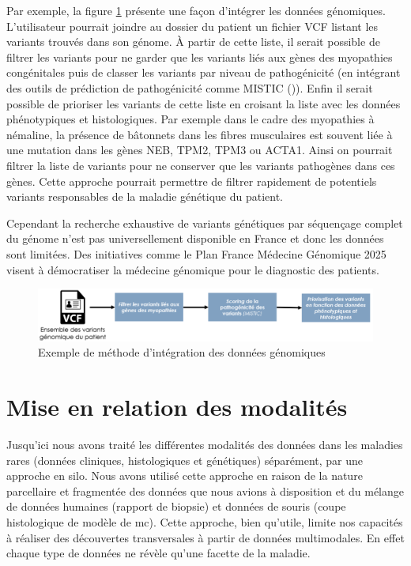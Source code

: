 Par exemple, la figure \ref{fig:variant_discuss} présente une façon d'intégrer les données génomiques. L'utilisateur pourrait joindre au dossier du patient un fichier VCF listant les variants trouvés dans son génome. À partir de cette liste, il serait possible de filtrer les variants pour ne garder que les variants liés aux gènes des myopathies congénitales puis de classer les variants par niveau de pathogénicité (en intégrant des outils de prédiction de pathogénicité comme MISTIC (\cite{chennen_mistic_2020})). Enfin il serait possible de prioriser les variants de cette liste en croisant la liste avec les données phénotypiques et histologiques. Par exemple dans le cadre des myopathies à némaline, la présence de bâtonnets dans les fibres musculaires est souvent liée à une mutation dans les gènes NEB, TPM2, TPM3 ou ACTA1. Ainsi on pourrait filtrer la liste de variants pour ne conserver que les variants pathogènes dans ces gènes. Cette approche pourrait permettre de filtrer rapidement de potentiels variants responsables de la maladie génétique du patient.

Cependant la recherche exhaustive de variants génétiques par séquençage complet du génome n'est pas universellement disponible en France et donc les données sont limitées. Des initiatives comme le Plan France Médecine Génomique 2025 visent à démocratiser la médecine génomique pour le diagnostic des patients.
 \begin{figure}[!ht]
 \centering
 \includegraphics[width=1\textwidth]{figures/variant_discuss.png}
 \caption[Exemple de méthode d'intégration des données génomiques]{Exemple de méthode d'intégration des données génomiques}
 \label{fig:variant_discuss}
\end{figure}

\section{Mise en relation des modalités}
Jusqu’ici nous avons traité les différentes modalités des données dans les maladies rares (données cliniques, histologiques et génétiques) séparément, par une approche en silo. Nous avons utilisé cette approche en raison de la nature parcellaire et fragmentée des données que nous avions à disposition et du mélange de données humaines (rapport de biopsie) et données de souris (coupe histologique de modèle de \gls{mc}). Cette approche, bien qu'utile, limite nos capacités à réaliser des découvertes transversales à partir de données multimodales. En effet chaque type de données ne révèle qu'une facette de la maladie. 

